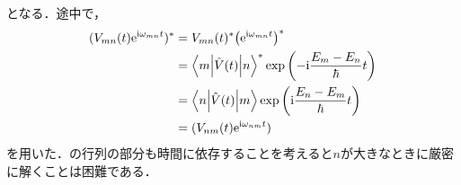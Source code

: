 \documentclass{report}
\begin{document}
  となる．途中で，
  \begin{align}
    (V_{mn}(t)\mathrm{e}^{\mathrm{i}\omega_{mn}t})^* &= V_{mn}(t)^* \qty(\mathrm{e}^{\mathrm{i}\omega_{mn}t})^* \\ 
    &= \mel**{m}{\hat{V}(t)}{n}^*\exp\qty(-\mathrm{i}\frac{E_m - E_n}{\hbar}t) \\ 
    &= \mel**{n}{\hat{V}(t)}{m}\exp\qty(\mathrm{i}\frac{E_n - E_m}{\hbar}t) \\ 
    &= (V_{nm}(t)\mathrm{e}^{\mathrm{i}\omega_{nm}t})
  \end{align}
  を用いた．の行列の部分も時間に依存することを考えると$n$が大きなときに厳密に解くことは困難である．
\end{document}
